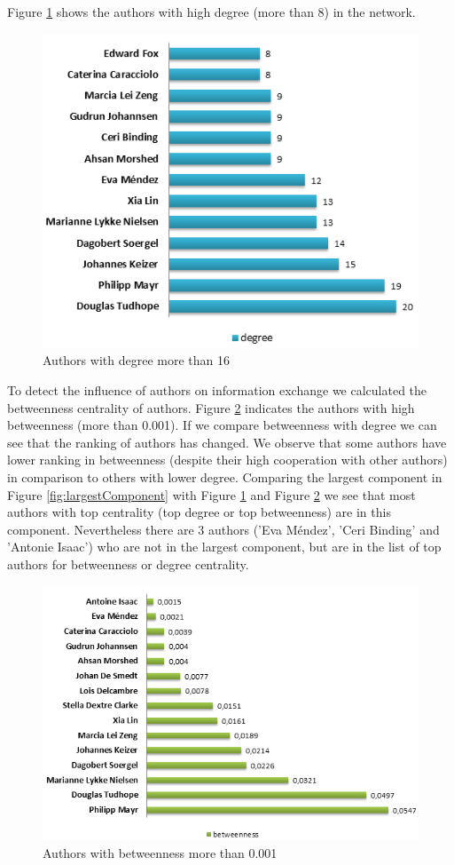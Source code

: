 \documentclass[runningheads,a4paper]{llncs}
\begin{document}
Figure \ref{fig:degree16} shows the authors with high degree (more than 8) in the network. 

\begin{figure}[H]
	\centering
	\includegraphics[width=0.8\linewidth]{degree16}
	\caption{Authors with degree more than 16}
	\label{fig:degree16}
\end{figure}


To detect the influence of authors on information exchange we calculated the betweenness centrality of authors. Figure \ref{fig:betweenness} indicates the authors with high betweenness (more than 0.001). If we compare betweenness with degree we can see that the ranking of authors has changed. We observe that some authors have lower ranking in betweenness (despite their high cooperation with other authors) in comparison to others with lower degree. Comparing the largest component in Figure \ref{fig:largestComponent} with Figure \ref{fig:degree16} and Figure \ref{fig:betweenness} we see that most authors with top centrality (top degree or top betweenness) are in this component. Nevertheless there are 3 authors ('Eva Méndez', 'Ceri Binding' and 'Antonie Isaac') who are not in the largest component, but are in the list of top authors for betweenness or degree centrality.


\begin{figure}[H]
\centering
\includegraphics[width=0.8\linewidth]{betweenness}
\caption{Authors with betweenness more than 0.001}
\label{fig:betweenness}
\end{figure}
\end{document}
